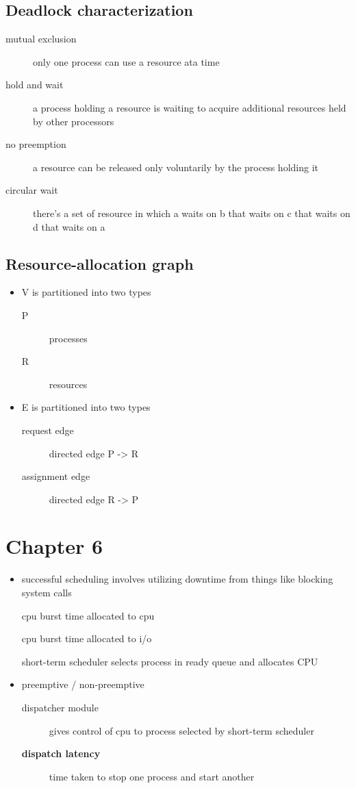 \documentclass[11pt]{article}
\begin{document}
\subsection{Deadlock characterization}
\label{sec:org66bad5f}
\begin{description}
\item[{mutual exclusion}] only one process can use a resource ata time
\item[{hold and wait}] a process holding a resource is waiting to acquire additional resources held by other processors
\item[{no preemption}] a resource can be released only voluntarily by the process holding it
\item[{circular wait}] there's a set of resource in which a waits on b that waits on c that waits on d that waits on a
\end{description}
\subsection{Resource-allocation graph}
\label{sec:org916f2e2}
\begin{itemize}
\item V is partitioned into two types
\begin{description}
\item[{P}] processes
\item[{R}] resources
\end{description}
\item E is partitioned into two types
\begin{description}
\item[{request edge}] directed edge P -> R
\item[{assignment edge}] directed edge R -> P
\end{description}
\end{itemize}
\section{Chapter 6}
\label{sec:org982d3a8}
\begin{itemize}
\item successful scheduling involves utilizing downtime from things like blocking system calls
\item[{cpu burst}] time allocated to cpu
\item[{cpu burst}] time allocated to i/o

\item[{short-term scheduler}] selects process in ready queue and allocates CPU
\item preemptive / non-preemptive

\begin{description}
\item[{dispatcher module}] gives control of cpu to process selected by short-term scheduler
\item[{\textbf{dispatch latency}}] time taken to stop one process and start another
\end{description}
\end{itemize}
\end{document}
